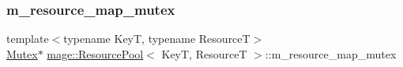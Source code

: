 \hypertarget{classmage_1_1_resource_pool_ad22becffd28fefa3c098c6bb40f52f41}{}\label{classmage_1_1_resource_pool_ad22becffd28fefa3c098c6bb40f52f41} 
\subsubsection{\texorpdfstring{m\+\_\+resource\+\_\+map\+\_\+mutex}{m\_resource\_map\_mutex}}
{\footnotesize\ttfamily template$<$typename KeyT, typename ResourceT$>$ \\
\hyperlink{classmage_1_1_mutex}{Mutex}$\ast$ \hyperlink{classmage_1_1_resource_pool}{mage\+::\+Resource\+Pool}$<$ KeyT, ResourceT $>$\+::m\+\_\+resource\+\_\+map\+\_\+mutex\hspace{0.3cm}{\ttfamily [private]}}

